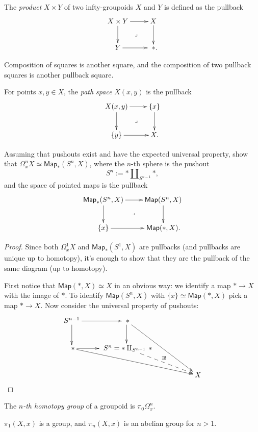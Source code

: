 The {\it product} $X\times Y$ of two
infty-groupoids
$X$ and  $Y$ is defined as the pullback
$$
\xymatrix{
X\times
Y\ar[r]\ar[d]\ar@{}[dr]|-{\lrcorner}&X\ar[d]
\\
Y\ar[r]& \ *.
}
$$

\medskip\noindent
Composition of squares is another square,
and the composition of two pullback squares
is another pullback square.

\begin{definition}
\label{definition-path-space}
For points $x,y \in X$, the {\it path space}
$X(x,y)$
is the pullback
$$
\xymatrix{
X(x,y)\ar[r]\ar[d]\ar@{}[dr]|-{\lrcorner}&
\{x\}\ar[d]\\
\{y\}\ar[r]&X.
}
$$
\end{definition}

\begin{exercise}[2.1.1]
\label{exercise-2.1.1}
Assuming that pushouts exist and have the
expected
universal property,
show that $\Omega^n_xX \simeq
\mathsf{Map}_*(S^n,X)$,
where the $n$-th sphere is the pushout
$$
S^n:=* \amalg_{S^{n-1}}*,
$$
and the space of pointed maps is the pullback
$$
\xymatrix{
\mathsf{Map}_*(S^n,X)\ar[r]\ar[d]\ar@{}[dr]|-
{\lrcorner}
&\mathsf{Map}(S^n,X)\ar[d]\\
\{x\}\ar[r]&\mathsf{Map}(*,X).
}
$$
\end{exercise}

\begin{proof}
Since both
$\Omega^1_xX$ and $\mathsf{Map}_*(S^1,X)$
are pullbacks (and pullbacks
are unique up to homotopy),
it's enough to show that they are
the pullback of the same diagram
(up to homotopy).

First notice that $\mathsf{Map}(*,X)\simeq X$
in an obvious way:
we identify a map $* \to X$
with the image of $*$.
To identify $\mathsf{Map}(S^n,X)$
with $\{x\} \simeq \mathsf{Map}(*,X)$
pick a map $* \to X$.
Now consider the universal
property of pushouts:
$$
\xymatrix{
S^{n-1} \ar[r] \ar[d] & \ * \ar[d] \ar[rrdd]
& & \\
\ * \ar[r] \ar[rrrd] & \ S^n=*
\amalg_{S^{n-1}} \, * \ar@{-->}[rrd]^{\exists
!}& & \\
& & & X
}
$$
\end{proof}

\begin{definition}
\label{definition-homotopy-groups}
The {\it $n$-th homotopy group} of a groupoid
is
$\pi_0\Omega^n_x$.
\end{definition}

\noindent
$\pi_1(X,x)$ is a group, and $\pi_n(X,x)$ is
an abelian group for $n>1$.


